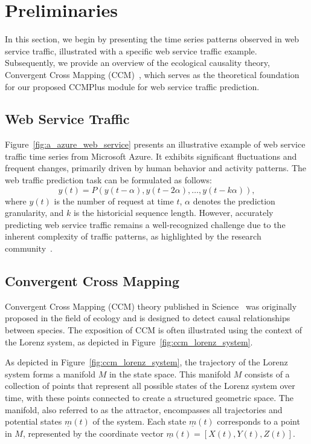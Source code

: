 \section{Preliminaries}
In this section, we begin by presenting the time series patterns observed in web service traffic, illustrated with a specific web service traffic example. Subsequently, we provide an overview of the ecological causality theory, Convergent Cross Mapping (CCM)~\cite{sugihara2012detecting}, which serves as the theoretical foundation for our proposed CCMPlus module for web service traffic prediction.
\subsection{Web Service Traffic}
Figure~\ref{fig:a_azure_web_service} presents an illustrative example of web service traffic time series from Microsoft Azure.
It exhibits significant fluctuations and frequent changes, primarily driven by human behavior and activity patterns.
The web traffic prediction task can be formulated as follows:
\begin{equation}
y(t) = P(y(t-\alpha), y(t-2\alpha), \dots, y(t-k\alpha)), \nonumber
\end{equation}
where $y(t)$ is the number of request at time $t$, $\alpha$ denotes the prediction granularity, and $k$ is the historicial sequence length.
However, accurately predicting web service traffic remains a well-recognized challenge due to the inherent complexity of traffic patterns, as highlighted by the research community~\cite{pan2023magicscaler, zou2024optscaler}.
\subsection{Convergent Cross Mapping}
 Convergent Cross Mapping (CCM) theory published in Science~\cite{sugihara2012detecting} was originally proposed in the field of ecology and is designed to detect causal relationships between species. The exposition of CCM is often illustrated using the context of the Lorenz system, as depicted in Figure~\ref{fig:ccm_lorenz_system}.

As depicted in Figure~\ref{fig:ccm_lorenz_system}, the trajectory of the Lorenz system forms a manifold \( M \) in the state space. This manifold \( M \) consists of a collection of points that represent all possible states of the Lorenz system over time, with these points connected to create a structured geometric space. The manifold, also referred to as the attractor, encompasses all trajectories and potential states \( \underline{m}(t) \) of the system. Each state \( \underline{m}(t) \) corresponds to a point in \( M \), represented by the coordinate vector \( \underline{m}(t) = [X(t), Y(t), Z(t)] \).

